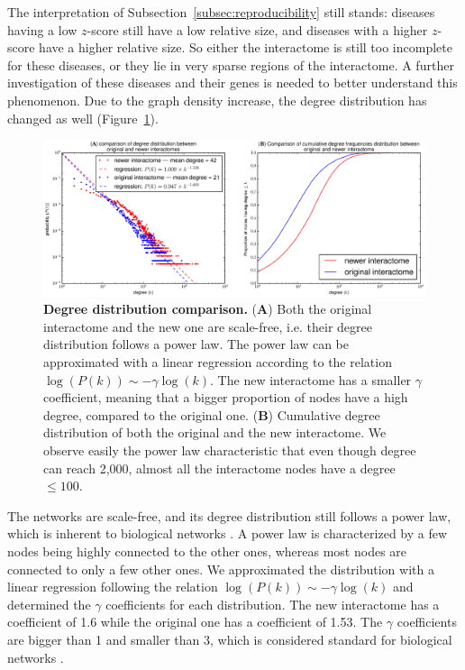 \documentclass[letterpaper]{article}
\begin{document}
	The interpretation of Subsection~\ref{subsec:reproducibility} still stands: diseases having
	a low $z$-score still have a low relative size, and diseases with a higher $z$-score have a higher
	relative size. So either the interactome is still too incomplete for these diseases, or they lie in
	very sparse regions of the interactome. A further investigation of these diseases and their genes
	is needed to better understand this phenomenon. Due to the graph density increase, the degree
	distribution has changed as well (Figure~\ref{fig:degree distribution comparison}).

	\begin{figure}[!t]
		\hspace{-1.9cm}
		\vspace{-.5cm}
		\includegraphics[scale=.475]{images/degree_distributions_comparison.eps}
		\caption{{\bf Degree distribution comparison.} ({\bf A})  Both the original interactome and the new one
		are scale-free, i.e. their degree distribution follows a power law. The power law can be approximated
		with a linear regression according to the relation $\log(P(k)) \sim -\gamma\log(k)$. The new interactome
		has a smaller $\gamma$ coefficient, meaning that a bigger proportion of nodes have a high degree,
		compared to the original one.
		({\bf B}) Cumulative degree distribution of both the original and the new interactome. We observe
		easily the power law characteristic that even though degree can reach 2,000, almost all the interactome
		nodes have a degree $\leq 100$.
		\label{fig:degree distribution comparison}}
		\vspace{-.4cm}
	\end{figure}

	The networks are scale-free, and its degree distribution still follows a power law, which is inherent to
	biological networks \cite{vidal2011interactome}. A power law is characterized by a few nodes being highly
	connected to the other ones, whereas most nodes are connected to only a few other ones. We approximated
	the distribution with a linear regression following the relation $\log(P(k)) \sim -\gamma\log(k)$ and
	determined the $\gamma$ coefficients for each distribution. The new interactome has a coefficient of
	1.6 while the original one has a coefficient of 1.53. The $\gamma$ coefficients are bigger than 1 and
	smaller than 3, which is considered standard for biological networks
	\citep{UnderstandingTheCellFunctionalOrganization,vidal2011interactome}.
\end{document}
